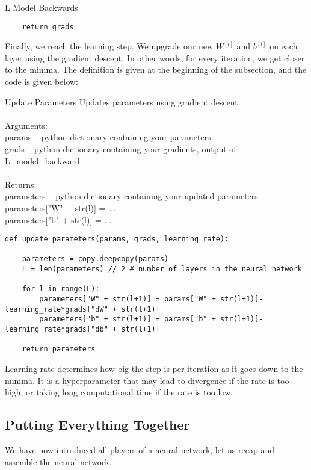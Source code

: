 \documentclass[a4paper]{article}
\begin{document}
\begin{enumerate}
\begin{alg}{L Model Backwards}{}
\begin{verbatim}
    return grads
\end{verbatim}
\end{alg}

Finally, we reach the learning step. We upgrade our new $W^{[l]}$ and $b^{[l]}$ on each layer using the gradient descent. In other words, for every iteration, we get closer to the minima. The definition is given at the beginning of the subsection, and the code is given below: 

\begin{alg}{Update Parameters}{} Updates parameters using gradient descent. \\~\\
Arguments: \\
params -- python dictionary containing your parameters \\
grads -- python dictionary containing your gradients, output of L\_model\_backward\\~\\
Returns: \\
parameters -- python dictionary containing your updated parameters \\
parameters["W" + str(l)] = ... \\
parameters["b" + str(l)] = ...\\
\begin{verbatim}
def update_parameters(params, grads, learning_rate):

    parameters = copy.deepcopy(params)
    L = len(parameters) // 2 # number of layers in the neural network

    for l in range(L):
        parameters["W" + str(l+1)] = params["W" + str(l+1)]-learning_rate*grads["dW" + str(l+1)]
        parameters["b" + str(l+1)] = params["b" + str(l+1)]-learning_rate*grads["db" + str(l+1)]

    return parameters
\end{verbatim}
\end{alg}

Learning rate determines how big the step is per iteration as it goes down to the minima. It is a hyperparameter that may lead to divergence if the rate is too high, or taking long computational time if the rate is too low. 

\subsection{Putting Everything Together}
We have now introduced all players of a neural network, let us recap and assemble the neural network. \\~\\


\end{enumerate}
\end{document}
